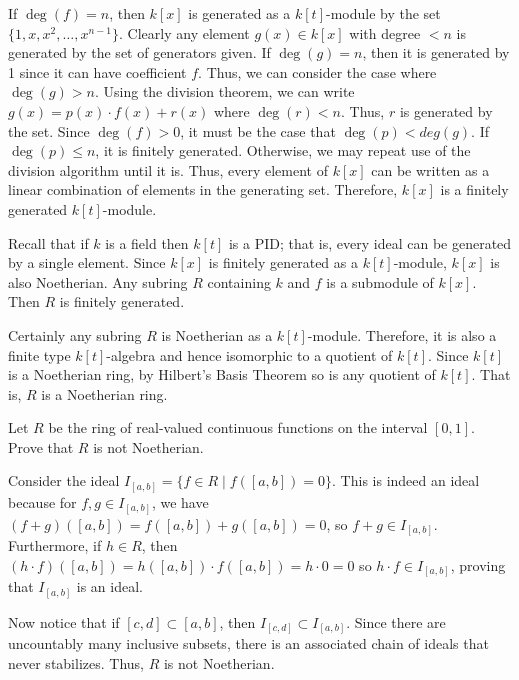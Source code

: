 \documentclass[../../master.tex]{subfiles}
\begin{document}
    \begin{solution}
        If $\deg(f) = n$, then $k[x]$ is generated as a $k[t]$-module by the set
        $\{1, x, x^2, \ldots, x^{n-1}\}$. Clearly any element $g(x) \in k[x]$
        with degree $< n$ is generated by the set of generators given. If
        $\deg(g) = n$, then it is generated by 1 since it can have coefficient
        $f$. Thus, we can consider the case where $\deg(g) > n$. Using the
        division theorem, we can write $g(x) = p(x) \cdot f(x) + r(x)$ where
        $\deg(r) < n$. Thus, $r$ is generated by the set. Since $\deg(f) > 0$,
        it must be the case that $\deg(p) < deg(g)$. If $\deg(p) \leq n$, it is
        finitely generated. Otherwise, we may repeat use of the division
        algorithm until it is. Thus, every element of $k[x]$ can be written as a
        linear combination of elements in the generating set. Therefore, $k[x]$
        is a finitely generated $k[t]$-module.

        Recall that if $k$ is a field then $k[t]$ is a PID; that is, every ideal
        can be generated by a single element. Since $k[x]$ is finitely generated
        as a $k[t]$-module, $k[x]$ is also Noetherian. Any subring $R$ containing
        $k$ and $f$ is a submodule of $k[x]$. Then $R$ is finitely generated.

        Certainly any subring $R$ is Noetherian as a $k[t]$-module. Therefore,
        it is also a finite type $k[t]$-algebra and hence isomorphic to a
        quotient of $k[t]$. Since $k[t]$ is a Noetherian ring, by Hilbert's
        Basis Theorem so is any quotient of $k[t]$. That is, $R$ is a Noetherian
        ring.
    \end{solution}

    \begin{problem}
        Let $R$ be the ring of real-valued continuous functions on the interval
        $[0, 1]$. Prove that $R$ is not Noetherian.
    \end{problem}

    \begin{solution}
        Consider the ideal $I_{[a, b]} = \{f \in R \mid f([a, b]) = 0\}$. This
        is indeed an ideal because for $f, g \in I_{[a, b]}$, we have $(f +
        g)([a, b]) = f([a, b]) + g([a, b]) = 0$, so $f + g \in I_{[a, b]}$.
        Furthermore, if $h \in R$, then $(h \cdot f)([a, b]) = h([a, b]) \cdot
        f([a, b]) = h \cdot 0 = 0$ so $h \cdot f \in I_{[a, b]}$, proving that
        $I_{[a, b]}$ is an ideal.

        Now notice that if $[c, d] \subset [a, b]$, then $I_{[c, d]} \subset
        I_{[a, b]}$. Since there are uncountably many inclusive subsets, there
        is an associated chain of ideals that never stabilizes. Thus, $R$ is not
        Noetherian.
    \end{solution}
\end{document}
